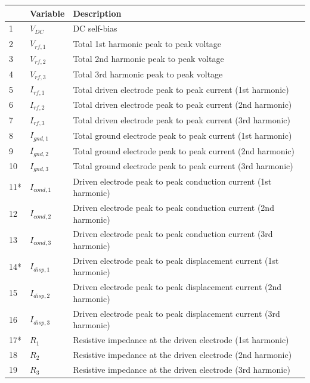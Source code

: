 \documentclass[12pt]{iopart}
\begin{document}
\begin{table}[]
    \centering
\begin{tabular}{|p{1cm}|p{2cm}|p{12.5cm}|}
        \hline
        & Variable & Description\\ 
        \hline
       1 & $V_{DC}$ & DC self-bias\\
       2 & $V_{rf,1}$ & Total 1st harmonic peak to peak voltage\\
       3 & $V_{rf,2}$ & Total 2nd harmonic peak to peak voltage\\
       4 & $V_{rf,3}$ & Total 3rd harmonic peak to peak voltage\\
       5 & $I_{rf,1}$ & Total driven electrode peak to peak current (1st harmonic)\\
       6 & $I_{rf,2}$ & Total driven electrode peak to peak current (2nd harmonic)\\
       7 & $I_{rf,3}$ & Total driven electrode peak to peak current (3rd harmonic)\\
       8 & $I_{gnd,1}$ & Total ground electrode peak to peak current (1st harmonic)\\
       9 & $I_{gnd,2}$ & Total ground electrode peak to peak current (2nd harmonic)\\
       10 & $I_{gnd,3}$ & Total ground electrode peak to peak current (3rd harmonic)\\
       11* & $I_{cond,1}$ & Driven electrode peak to peak conduction current (1st harmonic) \\
       12 & $I_{cond,2}$ & Driven electrode peak to peak conduction current (2nd harmonic) \\
       13 & $I_{cond,3}$ & Driven electrode peak to peak conduction current (3rd harmonic) \\       14* & $I_{disp,1}$ & Driven electrode peak to peak displacement current (1st harmonic) \\     15 & $I_{disp,2}$ & Driven electrode peak to peak displacement current (2nd harmonic) \\
       16 & $I_{disp,3}$ & Driven electrode peak to peak displacement current (3rd harmonic) \\
       17* & $R_{1}$ & Resistive impedance at the driven electrode (1st harmonic) \\
       18 & $R_{2}$ & Resistive impedance at the driven electrode (2nd harmonic) \\
       19 & $R_{3}$ & Resistive impedance at the driven electrode (3rd harmonic) \\

\end{tabular}
\end{table}
\end{document}
